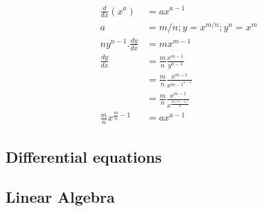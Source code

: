 \documentclass{article}
\begin{document}
                    \begin{align*}
                        \frac{d}{dx} (x^a) &= ax^{a-1}\\
                        a &= m/n ; y = x^{m/n} ; y^n = x^m\\
                        ny^{n-1}.\frac{dy}{dx} &= mx^{m-1}\\
                        \frac{dy}{dx} &= \frac{m}{n} \frac{x^{m-1}}{y^{n-1}}\\
                         &= \frac{m}{n} \frac{x^{m-1}}{x^{{m-1}^{n-1}}}\\
                         &= \frac{m}{n} \frac{x^{m-1}}{x^{\frac{m(n-1)}{n}}}\\
                         \frac{m}{n}x^{\frac{m}{n} -1} &= ax^{a-1}
                    \end{align*}


        \subsection{Differential equations}

        \subsection{Linear Algebra}
\end{document}
